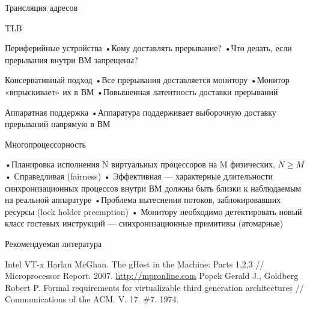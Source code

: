 \documentclass{beamer}
\begin{document}
\begin{frame}{Трансляция адресов}
\centering
 
\end{frame}

\begin{frame}{TLB}

\end{frame}

\begin{frame}{Периферийные устройства}
•Кому доставлять
прерывание?
•Что делать, если
прерывания внутри ВМ
запрещены?

\end{frame}

\begin{frame}{Консервативный подход}
•Все прерывания доставляется
монитору
•Монитор «впрыскивает» их в ВМ
•Повышенная латентность
доставки прерываний

\end{frame}

\begin{frame}{Аппаратная поддержка}
•Аппаратура поддерживает
выборочную доставку
прерываний напрямую в ВМ

\end{frame}


\begin{frame}{Многопроцессорность}

•Планировка исполнения N виртуальных процессоров на M
физических, $N \geqslant M$
• Справедливая (fairness)
• Эффективная — характерные длительности
синхронизационных процессов внутри ВМ должны
быть близки к наблюдаемым на реальной аппаратуре
•Проблема вытеснения потоков, заблокировавших ресурсы
(lock holder preemption)
• Монитору необходимо детектировать новый класс
гостевых инструкций — синхронизационные
примитивы (атомарные)

\end{frame}


\begin{frame}[allowframebreaks]{Рекомендуемая литература}
\begin{thebibliography}{99}
 Intel VT-x
 Harlan McGhan. The gHost in the Machine: Parts 1,2,3 // Microprocessor Report. 2007. \url{http://mpronline.com}
 Popek Gerald J., Goldberg Robert P. Formal requirements for virtualizable third generation
architectures // Communications of the ACM. V. 17. \#7. 1974.


\end{thebibliography}
\end{frame}
\end{document}
